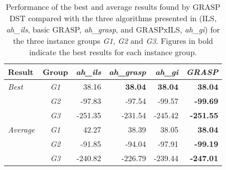 \begin{table}[htbp!]
\centering
\caption{Performance of the best and average results found by GRASP DST compared with the three algorithms presented in \citet{aithaddadene2016} (ILS, \emph{ah\_ils}, basic GRASP,  \emph{ah\_grasp}, and GRASPxILS, \emph{ah\_gi}) for the three instance groups \emph{G1}, \emph{G2} and \emph{G3}. Figures in bold indicate the best results for each instance group.}
\begin{tabular}{lcrrrr}
	\toprule
	Result & Group & \emph{ah\_ils} & \emph{ah\_grasp} & \emph{ah\_gi} & \emph{GRASP} \\  \midrule                                            
    \emph{Best} & \emph{G1} & 38.16 & \textbf{38.04} & \textbf{38.04} & \textbf{38.04} \\  
    & \emph{G2} & -97.83 & -97.54 & -99.57 & \textbf{-99.69} \\  
    & \emph{G3} & -251.35 & -231.54 & -245.42 & \textbf{-251.55} \\  
    \midrule                                              
    \emph{Average} & \emph{G1} & 42.27 & 38.39 & 38.05 & \textbf{38.04} \\  
    & \emph{G2} & -91.85 & -94.04 & -97.91 & \textbf{-99.19} \\  
    & \emph{G3} & -240.82 & -226.79 & -239.44 & \textbf{-247.01} \\  
    \bottomrule
    \end{tabular}
\label{table:grouptableaithcombined}
\end{table}